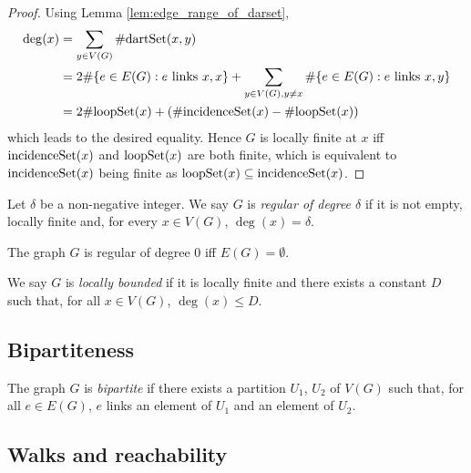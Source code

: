 \begin{proof}
  Using Lemma \ref{lem:edge_range_of_darset},
  \begin{align*}
    \deg(x)
    & = \sum_{y \in V(G)} \# \mathrm{dartSet}(x,y) \\
    & = 2 \# \{e \in E(G) : e \text{ links }x,x\}
    + \sum_{y \in V(G), y \neq x} \# \{e \in E(G) : e \text{ links }x,y\}\\
    & = 2 \# \mathrm{loopSet}(x) + (\# \mathrm{incidenceSet}(x) - \# \mathrm{loopSet}(x))
  \end{align*}
  which leads to the desired equality. Hence $G$ is locally finite at $x$ iff
  $\mathrm{incidenceSet}(x)$ and $\mathrm{loopSet}(x)$ are both finite, which is equivalent to
  $\mathrm{incidenceSet}(x)$ being finite as $\mathrm{loopSet}(x) \subseteq \mathrm{incidenceSet}(x)$.
\end{proof}

\begin{definition}
  \label{def:regular}
  Let $\delta$ be a non-negative integer.
  We say $G$ is \emph{regular of degree $\delta$} if it is not empty, locally finite and,
  for every $x \in V(G)$, $\deg (x) = \delta$.
\end{definition}

\begin{lemma}
  \label{lem:regular_zero}
  The graph $G$ is regular of degree $0$ iff $E(G)=\emptyset$.
\end{lemma}

\begin{definition}
  \label{def:locally_bounded}
  We say $G$ is \emph{locally bounded} if
  it is locally finite and there exists a constant $D$ such that,
  for all $x \in V(G)$, $\deg(x) \leq D$.
\end{definition}


\subsection{Bipartiteness}

\begin{definition}
  \label{def:bipartite}
  The graph $G$ is \emph{bipartite} if there exists a partition $U_1$,
  $U_2$ of $V(G)$ such that, for all $e \in E(G)$, $e$ links an element of $U_1$
  and an element of $U_2$.
\end{definition}

\subsection{Walks and reachability}

